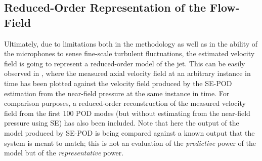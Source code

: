 \subsection{Reduced-Order Representation of the Flow-Field}
Ultimately, due to limitations both in the methodology as well as in the ability of the microphones to sense fine-scale turbulent fluctuations, the estimated velocity field is going to represent a reduced-order model of the jet.
This can be easily observed in , where the measured axial velocity field at an arbitrary instance in time has been plotted against the velocity field produced by the SE-POD estimation from the near-field pressure at the same instance in time.
For comparison purposes, a reduced-order reconstruction of the measured velocity field from the first 100 POD modes (but without estimating from the near-field pressure using SE) has also been included.
Note that here the output of the model produced by SE-POD is being compared against a known output that the system is meant to match; this is not an evaluation of the \textit{predictive} power of the model but of the \textit{representative} power.
